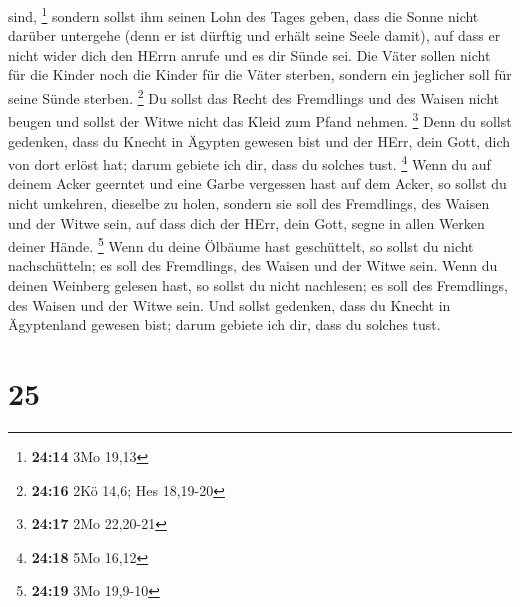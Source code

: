 sind, \footnote{\textbf{24:14} 3Mo 19,13}  sondern sollst
ihm seinen Lohn des Tages geben, dass die Sonne nicht darüber untergehe
(denn er ist dürftig und erhält seine Seele damit), auf dass er nicht
wider dich den HErrn anrufe und es dir Sünde sei.  Die
Väter sollen nicht für die Kinder noch die Kinder für die Väter sterben,
sondern ein jeglicher soll für seine Sünde sterben. \footnote{\textbf{24:16}
  2Kö 14,6; Hes 18,19-20}  Du sollst das Recht des
Fremdlings und des Waisen nicht beugen und sollst der Witwe nicht das
Kleid zum Pfand nehmen. \footnote{\textbf{24:17} 2Mo 22,20-21}
 Denn du sollst gedenken, dass du Knecht in Ägypten
gewesen bist und der HErr, dein Gott, dich von dort erlöst hat; darum
gebiete ich dir, dass du solches tust. \footnote{\textbf{24:18} 5Mo
  16,12}  Wenn du auf deinem Acker geerntet und eine
Garbe vergessen hast auf dem Acker, so sollst du nicht umkehren,
dieselbe zu holen, sondern sie soll des Fremdlings, des Waisen und der
Witwe sein, auf dass dich der HErr, dein Gott, segne in allen Werken
deiner Hände. \footnote{\textbf{24:19} 3Mo 19,9-10}  Wenn
du deine Ölbäume hast geschüttelt, so sollst du nicht nachschütteln; es
soll des Fremdlings, des Waisen und der Witwe sein.  Wenn
du deinen Weinberg gelesen hast, so sollst du nicht nachlesen; es soll
des Fremdlings, des Waisen und der Witwe sein.  Und
sollst gedenken, dass du Knecht in Ägyptenland gewesen bist; darum
gebiete ich dir, dass du solches tust.

\hypertarget{section-24}{%
\section{25}\label{section-24}}

